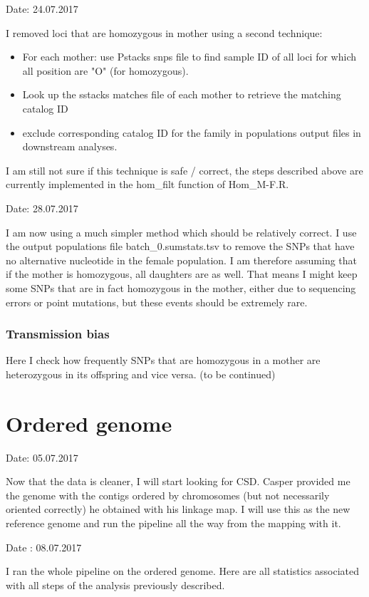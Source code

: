\documentclass[10pt,a4paper]{report}
\begin{document}
Date: 24.07.2017

I removed loci that are homozygous in mother using a second technique: 
\begin{itemize}
\item For each mother: use Pstacks snps file to find sample ID of all loci for which all position are "O" (for homozygous).
\item Look up the sstacks matches file of each mother to retrieve the matching catalog ID
\item exclude corresponding catalog ID for the family in populations output files in downstream analyses.
\end{itemize}

I am still not sure if this technique is safe / correct, the steps described above are currently implemented in the hom\_filt function of Hom\_M-F.R.

Date: 28.07.2017

I am now using a much simpler method which should be  relatively correct. I use the output populations file batch\_0.sumstats.tsv to remove the SNPs that have no alternative nucleotide in the female population. I am therefore
assuming that if the mother is homozygous, all daughters are as well. That means I might keep some SNPs that are in fact homozygous in the mother, either due to sequencing errors or point mutations, but these events should be extremely rare.

\subsection{Transmission bias}

Here I check how frequently SNPs that are homozygous in a mother are heterozygous in its offspring and vice versa.
(to be continued)

\chapter{Ordered genome}

Date: 05.07.2017

Now that the data is cleaner, I will start looking for CSD. Casper provided me the genome with the contigs ordered by chromosomes (but not necessarily oriented correctly) he obtained with his linkage map. I will use this as the new reference genome and run the pipeline all the way from the mapping with it.

Date : 08.07.2017

I ran the whole pipeline on the ordered genome. Here are all statistics associated with all steps of the analysis previously described.\\
\FloatBarrier
\end{document}
